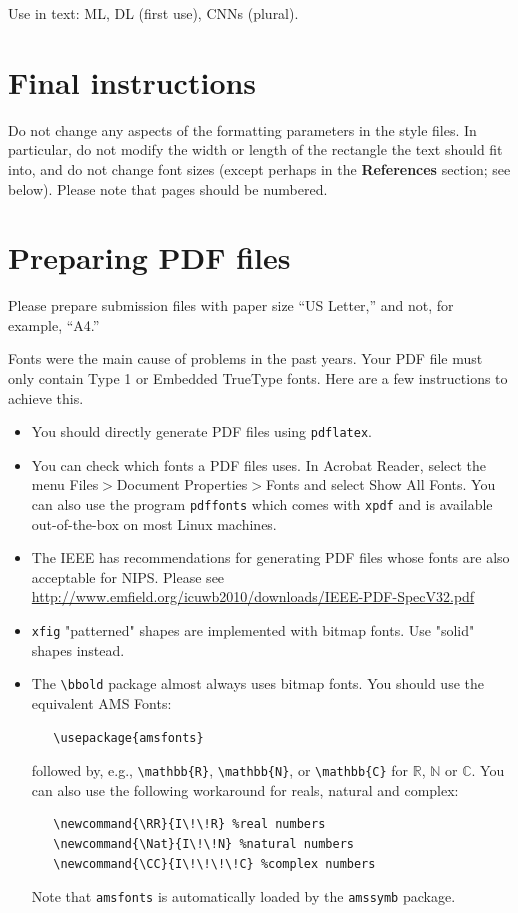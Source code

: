 \documentclass{article}
\begin{document}
Use in text: \ac{ML}, \acf{DL} (first use), \acp{CNN} (plural).

\section{Final instructions}

Do not change any aspects of the formatting parameters in the style
files.  In particular, do not modify the width or length of the
rectangle the text should fit into, and do not change font sizes
(except perhaps in the \textbf{References} section; see below). Please
note that pages should be numbered.

\section{Preparing PDF files}

Please prepare submission files with paper size ``US Letter,'' and
not, for example, ``A4.''

Fonts were the main cause of problems in the past years. Your PDF file
must only contain Type 1 or Embedded TrueType fonts. Here are a few
instructions to achieve this.

\begin{itemize}

\item You should directly generate PDF files using \verb+pdflatex+.

\item You can check which fonts a PDF files uses.  In Acrobat Reader,
  select the menu Files$>$Document Properties$>$Fonts and select Show
  All Fonts. You can also use the program \verb+pdffonts+ which comes
  with \verb+xpdf+ and is available out-of-the-box on most Linux
  machines.

\item The IEEE has recommendations for generating PDF files whose
  fonts are also acceptable for NIPS. Please see
  \url{http://www.emfield.org/icuwb2010/downloads/IEEE-PDF-SpecV32.pdf}

\item \verb+xfig+ "patterned" shapes are implemented with bitmap
  fonts.  Use "solid" shapes instead.

\item The \verb+\bbold+ package almost always uses bitmap fonts.  You
  should use the equivalent AMS Fonts:
\begin{verbatim}
   \usepackage{amsfonts}
\end{verbatim}
followed by, e.g., \verb+\mathbb{R}+, \verb+\mathbb{N}+, or
\verb+\mathbb{C}+ for $\mathbb{R}$, $\mathbb{N}$ or $\mathbb{C}$.  You
can also use the following workaround for reals, natural and complex:
\begin{verbatim}
   \newcommand{\RR}{I\!\!R} %real numbers
   \newcommand{\Nat}{I\!\!N} %natural numbers
   \newcommand{\CC}{I\!\!\!\!C} %complex numbers
\end{verbatim}
Note that \verb+amsfonts+ is automatically loaded by the
\verb+amssymb+ package.

\end{itemize}
\end{document}
